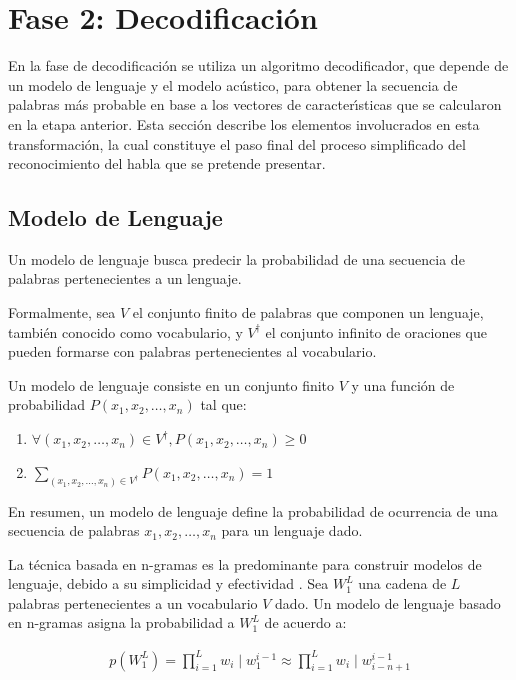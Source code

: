 \section{Fase 2: Decodificaci\'on}
\label{sec:decoding}

En la fase de decodificaci\'on se utiliza un algoritmo decodificador, que depende de un modelo de lenguaje 
y el modelo ac\'ustico, para obtener la secuencia de palabras m\'as probable en base a los vectores 
de caracter{\'\i}sticas que se calcularon en la etapa anterior. 
Esta secci\'on describe los elementos involucrados en esta transformaci\'on, la cual constituye el paso
final del proceso simplificado del reconocimiento del habla que se pretende presentar.

\subsection{Modelo de Lenguaje}
Un modelo de lenguaje busca predecir la probabilidad de una secuencia de palabras pertenecientes a un lenguaje.

Formalmente, sea $V$ el conjunto finito de palabras que componen un lenguaje, tambi\'en conocido como 
vocabulario, y $V^\dag$ el conjunto infinito de oraciones que pueden formarse con palabras pertenecientes 
al vocabulario.

Un modelo de lenguaje \cite{CollinsLanguage} consiste en un conjunto finito $V$ y una funci\'on 
de probabilidad $P(x_1,x_2,\ldots,x_n)$ tal que:
\begin{enumerate}

\item $\forall (x_1,x_2,\ldots,x_n) \in V^\dag, P(x_1,x_2,\ldots,x_n) \ge 0$

\item $\displaystyle \sum_{(x_1,x_2,\ldots,x_n) \in V^\dag} P(x_1,x_2,\ldots,x_n) = 1$
\end{enumerate}


En resumen, un modelo de lenguaje define la probabilidad de ocurrencia de una secuencia de palabras
$x_1,x_2,\ldots,x_n$ para un lenguaje dado.

La t\'ecnica basada en n-gramas es la predominante para construir modelos de lenguaje, 
debido a su simplicidad y efectividad \cite{GaoComparative2010}.
Sea $W^L_1$ una cadena de $L $ palabras pertenecientes a un vocabulario $V$ dado. 
Un modelo de lenguaje basado en n-gramas asigna la probabilidad a $W^L_1$ de acuerdo a:

\begin{align}
p(W^L_1) = \displaystyle \prod^L_{i = 1} w_i \mid w^{i - 1}_1 \approx \displaystyle \prod^L_{i = 1} w_i \mid w^{i - 1}_{i - n + 1}
\end{align}

